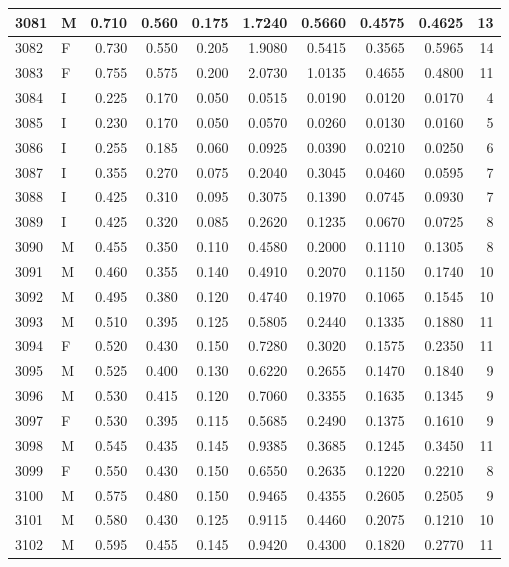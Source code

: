 \documentclass[9pt,twocolumn,twoside,]{pnas-new}
\begin{document}
\begin{tabular}{l|l|r|r|r|r|r|r|r|r}
\hline
3081 & M & 0.710 & 0.560 & 0.175 & 1.7240 & 0.5660 & 0.4575 & 0.4625 & 13\\
\hline
3082 & F & 0.730 & 0.550 & 0.205 & 1.9080 & 0.5415 & 0.3565 & 0.5965 & 14\\
\hline
3083 & F & 0.755 & 0.575 & 0.200 & 2.0730 & 1.0135 & 0.4655 & 0.4800 & 11\\
\hline
3084 & I & 0.225 & 0.170 & 0.050 & 0.0515 & 0.0190 & 0.0120 & 0.0170 & 4\\
\hline
3085 & I & 0.230 & 0.170 & 0.050 & 0.0570 & 0.0260 & 0.0130 & 0.0160 & 5\\
\hline
3086 & I & 0.255 & 0.185 & 0.060 & 0.0925 & 0.0390 & 0.0210 & 0.0250 & 6\\
\hline
3087 & I & 0.355 & 0.270 & 0.075 & 0.2040 & 0.3045 & 0.0460 & 0.0595 & 7\\
\hline
3088 & I & 0.425 & 0.310 & 0.095 & 0.3075 & 0.1390 & 0.0745 & 0.0930 & 7\\
\hline
3089 & I & 0.425 & 0.320 & 0.085 & 0.2620 & 0.1235 & 0.0670 & 0.0725 & 8\\
\hline
3090 & M & 0.455 & 0.350 & 0.110 & 0.4580 & 0.2000 & 0.1110 & 0.1305 & 8\\
\hline
3091 & M & 0.460 & 0.355 & 0.140 & 0.4910 & 0.2070 & 0.1150 & 0.1740 & 10\\
\hline
3092 & M & 0.495 & 0.380 & 0.120 & 0.4740 & 0.1970 & 0.1065 & 0.1545 & 10\\
\hline
3093 & M & 0.510 & 0.395 & 0.125 & 0.5805 & 0.2440 & 0.1335 & 0.1880 & 11\\
\hline
3094 & F & 0.520 & 0.430 & 0.150 & 0.7280 & 0.3020 & 0.1575 & 0.2350 & 11\\
\hline
3095 & M & 0.525 & 0.400 & 0.130 & 0.6220 & 0.2655 & 0.1470 & 0.1840 & 9\\
\hline
3096 & M & 0.530 & 0.415 & 0.120 & 0.7060 & 0.3355 & 0.1635 & 0.1345 & 9\\
\hline
3097 & F & 0.530 & 0.395 & 0.115 & 0.5685 & 0.2490 & 0.1375 & 0.1610 & 9\\
\hline
3098 & M & 0.545 & 0.435 & 0.145 & 0.9385 & 0.3685 & 0.1245 & 0.3450 & 11\\
\hline
3099 & F & 0.550 & 0.430 & 0.150 & 0.6550 & 0.2635 & 0.1220 & 0.2210 & 8\\
\hline
3100 & M & 0.575 & 0.480 & 0.150 & 0.9465 & 0.4355 & 0.2605 & 0.2505 & 9\\
\hline
3101 & M & 0.580 & 0.430 & 0.125 & 0.9115 & 0.4460 & 0.2075 & 0.1210 & 10\\
\hline
3102 & M & 0.595 & 0.455 & 0.145 & 0.9420 & 0.4300 & 0.1820 & 0.2770 & 11\\

\end{tabular}
\end{document}
